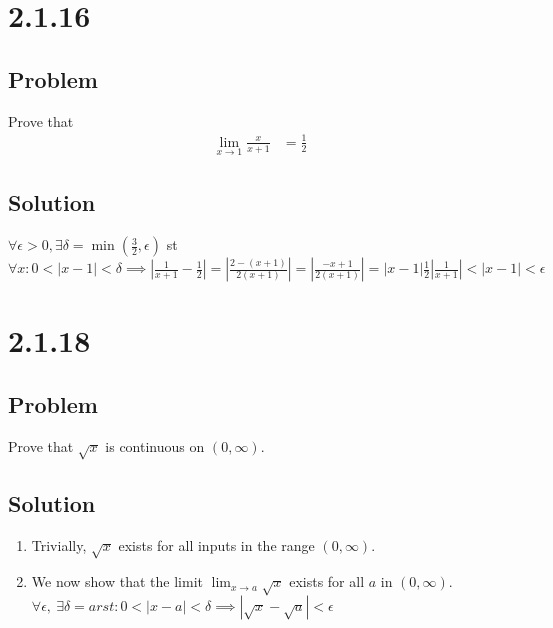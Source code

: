 \documentclass[12pt]{article}
\newcommand{\round}[1]{\left(       #1 \right)      }
\newcommand{\abs}  [1]{\left|       #1 \right|      }
\begin{document}
\section*{2.1.16}

\subsection*{Problem}
Prove that
\begin{align*}
    \lim_{x \to 1} \frac{x}{x + 1} &= \frac{1}{2}
\end{align*}

\subsection*{Solution}
$\forall \epsilon > 0, \exists \delta = \min\round{\frac{3}{2}, \epsilon}$ st $\forall x : 0 < \abs{x - 1} < \delta \implies \abs{\frac{1}{x + 1} - \frac{1}{2}} = \abs{\frac{2 - (x + 1)}{2(x + 1)}} = \abs{\frac{-x + 1}{2(x + 1)}} = \abs{x - 1} \frac{1}{2} \abs{\frac{1}{x + 1}} < \abs{x - 1} < \epsilon$



\section*{2.1.18}

\subsection*{Problem}
Prove that $\sqrt{x}$ is continuous on $(0, \infty)$.

\subsection*{Solution}
\begin{enumerate}
    \item Trivially, $\sqrt{x}$ exists for all inputs in the range $(0, \infty)$.
    \item We now show that the limit $\lim_{x \to a} \sqrt{x}$ exists for all $a$ in $(0, \infty)$. $\forall \epsilon,\ \exists \delta = arst : 0 < \abs{x - a} < \delta \implies \abs{\sqrt{x} - \sqrt{a}} < \epsilon$
\end{enumerate}
\end{document}
